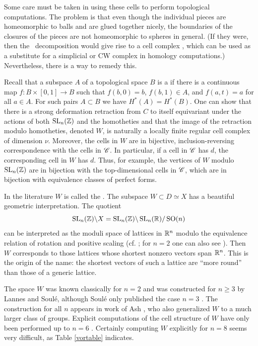 Some care must be taken in using these cells to perform topological
computations.  The problem is that even though the individual pieces
are homeomorphic to balls and are glued together nicely, the
boundaries of the closures of the pieces are not homeomorphic to
spheres in general.  (If they were, then the \Vor \ decomposition
would give rise to a  cell complex \cite{cooke.finney},
which can be used as a substitute for a simplicial or CW complex in
homology computations.)  Nevertheless, there is a way to remedy this.

Recall that a subspace $A$ of a topological space $B$ is a
 if there is a continuous map
$f\colon B\times [0,1]\rightarrow B$ such that $f (b,0)=b$, $f
(b,1)\in A$, and $f (a,t) = a$ for all $a\in A$.  For such pairs
$A\subset B$ we have $H^{*} (A) = H^{*} (B)$.  One can show that there
is a strong deformation retraction from $C$ to itself equivariant
under the actions of both $\operatorname{SL}_n(\mathbb{Z})$ and the homotheties and that
the image of the retraction modulo homotheties, denoted $W$, is
naturally a locally finite regular cell complex of dimension $\nu $.
Moreover, the cells in $W$ are in bijective, inclusion-reversing
correspondence with the cells in $\mathscr C $.  In particular, if a cell in
$\mathscr C$ has  $d$, the corresponding cell in $W$ has
 $d$.  Thus, for example, the vertices of $W$ modulo
$\operatorname{SL}_{n} (\mathbb{Z})$ are in bijection with the top-dimensional cells in
$\mathscr C$, which are in bijection with equivalence classes of perfect
forms.

In the literature $W$ is called the .  The
subspace $W\subset D \simeq X$ has a beautiful geometric
interpretation.  The quotient
\[
\operatorname{SL}_{n} (\mathbb{Z})\backslash X = \operatorname{SL}_{n} (\mathbb{Z})
\backslash \operatorname{SL}_{n} (\mathbb{R})/ \operatorname{SO} (n)
\]
can be interpreted as the moduli space of lattices in $\mathbb{R}^{n}$ modulo
the equivalence relation of rotation and positive scaling
(cf. \cite{ash.gross}; for $n=2$ one can also see \cite[VII,
Proposition 3]{serre:arithmetic}).  Then $W$ corresponds to those lattices whose
shortest nonzero vectors span $\mathbb{R}^{n}$.  This is the origin of the
name: the shortest vectors of such a lattice are ``more round'' than
those of a generic lattice.

The space $W$ was known classically for $n=2$ and was constructed for
$n\geq 3$ by Lannes and Soul\'e, although Soul\'e only published the
case $n=3$ \cite{soule}.  The construction for all $n$ appears in work
of Ash \cite{Ash80, ash.wrr}, who also generalized $W$ to a much
larger class of groups.  Explicit computations of the cell structure
of $W$ have only been performed up to $n=6$ \cite{gangl}.  Certainly
computing $W$ explicitly for $n=8$ seems very difficult, as Table
\ref{vortable} indicates.

